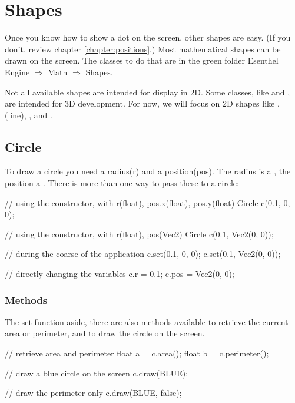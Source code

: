 \chapter{Shapes}

Once you know how to show a dot on the screen, other shapes are easy. (If you don't, review chapter \ref{chapter:positions}.) Most mathematical shapes can be drawn on the screen. The classes to do that are in the green folder Esenthel Engine $\Rightarrow$ Math $\Rightarrow$ Shapes.

Not all available shapes are intended for display in 2D. Some classes, like  and , are intended for 3D development. For now, we will focus on 2D shapes like ,  (line), ,  and .

\section{Circle}
To draw a circle you need a radius(r) and a position(pos). The radius is a , the position a . There is more than one way to pass these to a circle:

\begin{code}
// using the constructor, with r(float), pos.x(float), pos.y(float)
Circle c(0.1, 0, 0);

// using the constructor, with r(float), pos(Vec2)
Circle c(0.1, Vec2(0, 0));

// during the coarse of the application
c.set(0.1, 0, 0);
c.set(0.1, Vec2(0, 0));

// directly changing the variables
c.r = 0.1;
c.pos = Vec2(0, 0);
\end{code}

\subsection{Methods}
The set function aside, there are also methods available to retrieve the current area or perimeter, and to draw the circle on the screen.

\begin{code}
// retrieve area and perimeter
float a = c.area();
float b = c.perimeter();

// draw a blue circle on the screen
c.draw(BLUE);

// draw the perimeter only
c.draw(BLUE, false);
\end{code}

